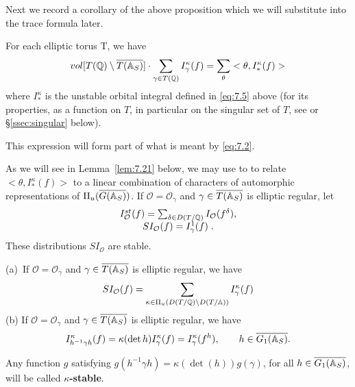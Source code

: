 Next we record a corollary of the above proposition 
which we will substitute into the trace formula later.

\begin{corollary}\label{cor:7.4}
For each elliptic torus T, we have 
\[
vol[T(\mathbb{Q} )\setminus \overline{T(\mathbb{A} _S)}]\cdot
\sum_{\gamma \in T({\mathbb Q})}
I_\gamma ^\kappa (f)=\sum_\theta <\theta ,I_{*}^\kappa (f)>
\]
where $I_{*}^\kappa $ is the unstable orbital integral defined in \eqref{eq:7.5}
above (for its properties, as a function on $T$, in particular on the
singular set of $T$, see \cite{LL} or \S\ref{ssec:singular} below).
\end{corollary}

This expression will form part of what is meant by \eqref{eq:7.2}.

As we will see in Lemma~\ref{lem:7.21} below,
we may use \cite{LL} to to relate $<\theta,I_{*}^\kappa (f)>$ to
a linear combination of characters of automorphic representations of
$\Pi_u(\overline{G(\mathbb{A} _S)})$. If $\mathcal{O}=\mathcal{O}_\gamma $
and $\gamma \in \overline{T(\mathbb{A} _S)}$ is elliptic regular, let 
\begin{equation}\label{eq:7.6}
\begin{array}{c}
I^{st}_{\mathcal{O}}(f)=\sum_{\delta\in D(T/\mathbb{Q} )}
I_{\mathcal{O}}(f^\delta),\\
SI_{\mathcal{O}}(f)=I^1_{\gamma}(f)\; .
\end{array}
\end{equation}
These distributions $SI_{\mathcal{O}}$ are stable.

\begin{lemma}\label{lem:7.5}
(a)\ If $\mathcal{O}=\mathcal{O}_\gamma $ and
$\gamma \in \overline{T(\mathbb{A} _S)}$ is
elliptic regular, we have 
\[
SI_{\mathcal{O}}(f)
=\sum_{\kappa \in \Pi _u(D(T/{\mathbb Q})\backslash D(T/\mathbb{A} ))}
I_\gamma ^\kappa (f)
\]
(b) If $\mathcal{O}=\mathcal{O}_\gamma $ and
$\gamma \in \overline{T(\mathbb{A} _S)}$ is elliptic regular, we have 
\[
I_{h^{-1}\gamma h}^\kappa (f)=\kappa (\det h)I_\gamma ^\kappa (f)=I_\gamma
^\kappa (f^h),\ \ \ \ \ \ h\in \overline{G_1(\mathbb{A} _S)}.
\]
\end{lemma}

Any function $g$ satisfying $g(h^{-1}\gamma h)=\kappa (\det (h))g(\gamma )$,
for all $h\in \overline{G_1(\mathbb{A} _S)}$, will be called
\textbf{$\kappa $-stable}.

